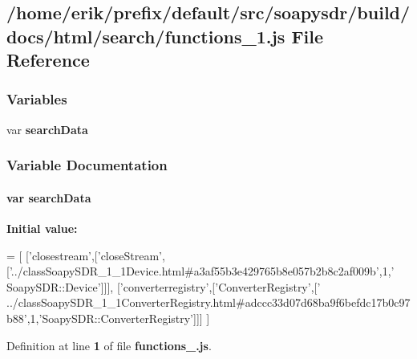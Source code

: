 \subsection{/home/erik/prefix/default/src/soapysdr/build/docs/html/search/functions\+\_\+1.js File Reference}
\label{functions__1_8js}
\subsubsection*{Variables}
\begin{DoxyCompactItemize}
\item 
var {\bf search\+Data}
\end{DoxyCompactItemize}


\subsubsection{Variable Documentation}
\paragraph[{search\+Data}]{\setlength{\rightskip}{0pt plus 5cm}var search\+Data}\label{functions__1_8js_ad01a7523f103d6242ef9b0451861231e}
{\bfseries Initial value\+:}
\begin{DoxyCode}
=
[
  [\textcolor{stringliteral}{'closestream'},[\textcolor{stringliteral}{'closeStream'},[\textcolor{stringliteral}{'../classSoapySDR\_1\_1Device.html#a3af55b3e429765b8e057b2b8c2af009b'},1,\textcolor{stringliteral}{'
      SoapySDR::Device'}]]],
  [\textcolor{stringliteral}{'converterregistry'},[\textcolor{stringliteral}{'ConverterRegistry'},[\textcolor{stringliteral}{'
      ../classSoapySDR\_1\_1ConverterRegistry.html#adccc33d07d68ba9f6befdc17b0c97b88'},1,\textcolor{stringliteral}{'SoapySDR::ConverterRegistry'}]]]
]
\end{DoxyCode}


Definition at line {\bf 1} of file {\bf functions\+\_.\+js}.

